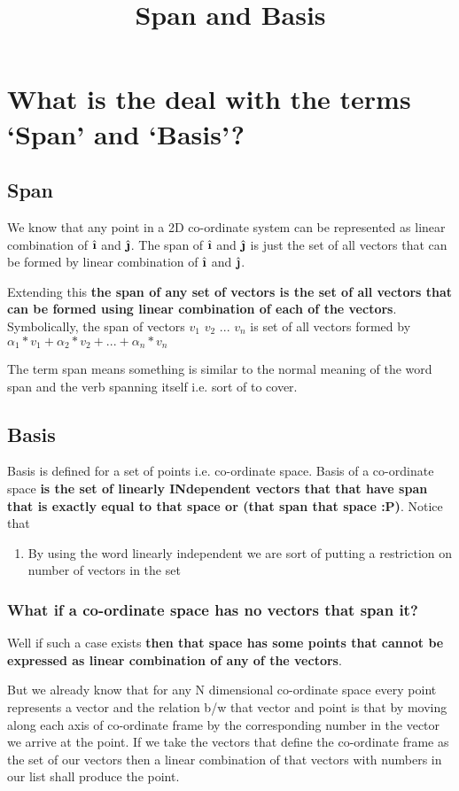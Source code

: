\documentclass[12pt]{article}
\title{Span and Basis}
\author{}
\date{}
\newcommand{\ihat}{\hat{\textbf{\i}}}
\newcommand{\jhat}{\hat{\textbf{\j}}}
\begin{document}
\maketitle

\section{What is the deal with the terms `Span' and `Basis'?}
\subsection{Span}
We know that any point in a 2D co-ordinate system can be represented as linear combination of $ \ihat $ and $ \jhat $.
The span of $ \ihat $ and $ \jhat $ is just the set of all vectors that can be formed by linear combination of $ \ihat $ and $ \jhat $.

Extending this \textbf{the span of any set of vectors is the set of all vectors that can be formed using linear combination of each of the vectors}. Symbolically, the span of vectors $ v_1 $ $ v_2 $ ... $ v_n $ is set of all vectors formed by $ \alpha_1 * v_1 + \alpha_2 * v_2 + ... + \alpha_n * v_n $

The term span means something is similar to the normal meaning of the word span and the verb spanning itself i.e. sort of to cover.

\subsection{Basis}
Basis is defined for a set of points i.e. co-ordinate space. Basis of a co-ordinate space \textbf{is the set of linearly INdependent vectors that that have span that is exactly equal to that space or (that span that space :P)}. Notice that
\begin{enumerate}
  \item By using the word linearly independent we are sort of putting a restriction on number of vectors in the set
\end{enumerate}

\subsubsection{What if a co-ordinate space has no vectors that span it?}
Well if such a case exists \textbf{then that space has some points that cannot be expressed as linear combination of any of the vectors}.

But we already know that for any N dimensional co-ordinate space every point represents a vector and the relation b/w that vector and point is that by moving along each axis of co-ordinate frame by the corresponding number in the vector we arrive at the point. If we take the vectors that define the co-ordinate frame as the set of our vectors then a linear combination of that vectors with numbers in our list shall produce the point.
\end{document}
